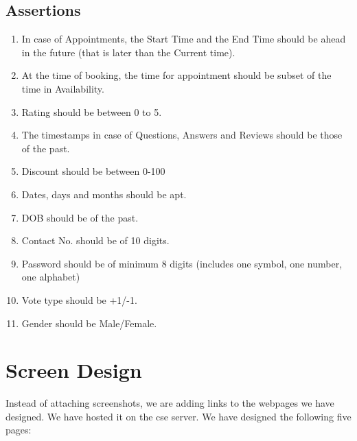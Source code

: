 \documentclass[a4paper]{article}
\begin{document}
\subsection{Assertions}
\begin{enumerate}
\item In case of Appointments, the Start Time and the End Time should be ahead in the future (that is later than the Current time).
\item At the time of booking, the time for appointment should be subset of the time in Availability.
\item Rating should be between 0 to 5.
\item The timestamps in case of Questions, Answers and Reviews should be those of the past.
\item Discount should be between 0-100%
\item Dates, days and months should be apt.
\item DOB should be of the past.
\item Contact No. should be of 10 digits.
\item Password should be of minimum 8 digits (includes one symbol, one number, one alphabet)
\item Vote type should be +1/-1. 
\item Gender should be Male/Female.
\end{enumerate}

\section{Screen Design}
Instead of attaching screenshots, we are adding links to the webpages we have designed. We have hosted it on the cse server. We have designed the following five pages:
\end{document}
